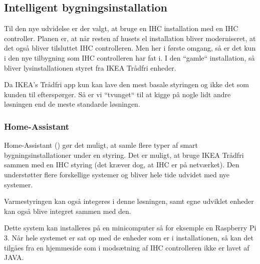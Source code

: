 \subsection{Intelligent bygningsinstallation}
Til den nye udvidelse er der valgt, at bruge en IHC installation med en IHC controller. Planen er, at når resten af husets el installation bliver moderniseret, at det også bliver tilsluttet IHC controlleren.
Men her i første omgang, så er det kun i den nye tilbygning som IHC controlleren har fat i. I den ``gamle`` installation, så bliver lysinstallationen styret fra IKEA Trådfri enheder.

Da IKEA's Trådfri app kun kan lave den mest basale styringen og ikke det som kunden til efterspørger. Så er vi ``tvunget`` til at kigge på nogle lidt andre løsningen end de meste standarde løsningen.

\subsubsection{Home-Assistant}
Home-Assistant (\cite{HAW:2018:Online}) gør det muligt, at samle flere typer af smart bygningsinstallationer under en styring.
Det er muligt, at bruge IKEA Trådfri sammen med en IHC styring (det kræver dog, at IHC er på netværket). Den understøtter flere forskellige systemer og bliver hele tide udvidet med nye systemer.

Varmestyringen kan også integeres i denne løsningen, samt egne udviklet enheder kan også blive integret sammen med den. 

Dette system kan installeres på en minicomputer så for eksemple en Raspberry Pi 3. Når hele systemet er sat op med de enheder som er i installationen, så kan det tilgåes fra en hjemmeside som i modsætning af IHC controlleren ikke er lavet af JAVA.